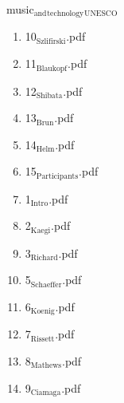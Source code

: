 \documentclass[11pt]{article}
\begin{document}
\item music$_{\text{and}}$$_{\text{technology}}$$_{\text{UNESCO}}$
\label{sec-1-1-1-1-11-19-26}
\begin{enumerate}
\item 10$_{\text{Szlifirski}}$.pdf
\label{sec-1-1-1-1-11-19-26-1}

\item 11$_{\text{Blaukopf}}$.pdf
\label{sec-1-1-1-1-11-19-26-2}

\item 12$_{\text{Shibata}}$.pdf
\label{sec-1-1-1-1-11-19-26-3}

\item 13$_{\text{Brun}}$.pdf
\label{sec-1-1-1-1-11-19-26-4}

\item 14$_{\text{Helm}}$.pdf
\label{sec-1-1-1-1-11-19-26-5}

\item 15$_{\text{Participants}}$.pdf
\label{sec-1-1-1-1-11-19-26-6}

\item 1$_{\text{Intro}}$.pdf
\label{sec-1-1-1-1-11-19-26-7}

\item 2$_{\text{Kaegi}}$.pdf
\label{sec-1-1-1-1-11-19-26-8}

\item 3$_{\text{Richard}}$.pdf
\label{sec-1-1-1-1-11-19-26-9}

\item 5$_{\text{Schaeffer}}$.pdf
\label{sec-1-1-1-1-11-19-26-10}

\item 6$_{\text{Koenig}}$.pdf
\label{sec-1-1-1-1-11-19-26-11}

\item 7$_{\text{Rissett}}$.pdf
\label{sec-1-1-1-1-11-19-26-12}

\item 8$_{\text{Mathews}}$.pdf
\label{sec-1-1-1-1-11-19-26-13}

\item 9$_{\text{Ciamaga}}$.pdf
\label{sec-1-1-1-1-11-19-26-14}
\end{enumerate}
\end{document}
